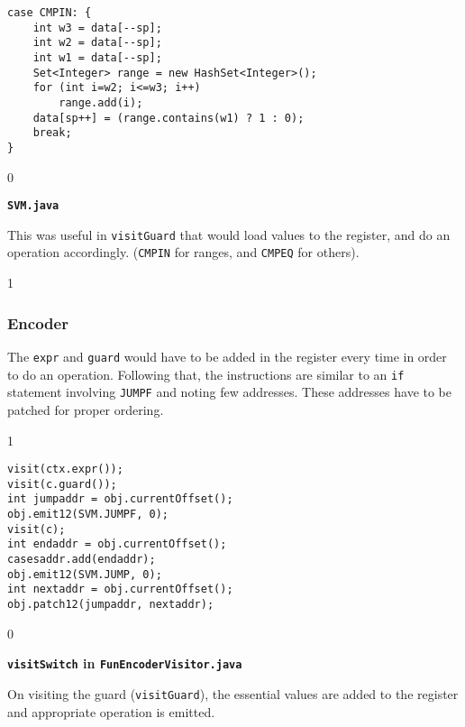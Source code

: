 \documentclass{article}
\newcommand{\code}[1]{\texttt{#1}}
\newenvironment{codelst}{\captionsetup{type=listing}}{}
\newcommand{\dividestages}{0}
\newcommand{\showencodecode}{1}
\newcommand{\act}[1]{
    \if\dividestages1
        \subsubsection{#1}
    \fi
}
\newcommand{\codecaption}[1]{
    \if\dividestages0
        \vspace{-0.75cm}
        \caption{\textbf{#1}}
        \vspace{0.4cm}
    \fi
}
\begin{document}
\begin{codelst}
\begin{verbatim}
case CMPIN: {
	int w3 = data[--sp];
	int w2 = data[--sp];
	int w1 = data[--sp];
	Set<Integer> range = new HashSet<Integer>();
	for (int i=w2; i<=w3; i++)
		range.add(i);
	data[sp++] = (range.contains(w1) ? 1 : 0);
	break;
}
\end{verbatim}
\codecaption{\code{SVM.java}}
\end{codelst}

\noindent This was useful in \code{visitGuard} that would load values to the register, and do an operation accordingly. (\code{CMPIN} for ranges, and \code{CMPEQ} for others).

\vspace{0.5cm}

\act{Encoder}

\vspace{0.5cm}

\noindent The \code{expr} and \code{guard} would have to be added in the register every time in order to do an operation. Following that, the instructions are similar to an \code{if} statement involving \code{JUMPF} and noting few addresses. These addresses have to be patched for proper ordering.

\if\showencodecode1

\vspace{0.5cm}

\begin{codelst}
\begin{verbatim}
visit(ctx.expr());
visit(c.guard());
int jumpaddr = obj.currentOffset();
obj.emit12(SVM.JUMPF, 0);
visit(c);
int endaddr = obj.currentOffset();
casesaddr.add(endaddr);
obj.emit12(SVM.JUMP, 0);
int nextaddr = obj.currentOffset();
obj.patch12(jumpaddr, nextaddr);
\end{verbatim}
\codecaption{\code{visitSwitch} in \code{FunEncoderVisitor.java}}
\end{codelst}

\vspace{0.5cm}

\fi

\vspace{0.5cm}

\noindent On visiting the guard (\code{visitGuard}), the essential values are added to the register and appropriate operation is emitted.

\vspace{0.75cm}
\end{document}
